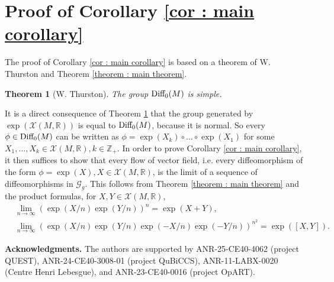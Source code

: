 \documentclass[10pt]{article}
\newcommand{\R}{{\mathbb R}}
\newcommand{\Z}{{\mathbb Z}}
\newcommand{\Chi}{{\mathcal X}}
\newtheorem{theorem}{Theorem}
\begin{document}
\section{Proof of Corollary \ref{cor : main corollary}}\label{sec:corollary}
The proof of Corollary \ref{cor : main corollary} is based on a theorem of W. Thurston \cite{thurston} and Theorem \ref{theorem : main theorem}.
\begin{theorem}[W. Thurston]\label{thurston theorem}
The group ${\rm Diff_0}(M)$ is simple. 
\end{theorem}
It is a direct consequence of Theorem \ref{thurston theorem} that the group generated by $\exp(\Chi(M,\R))$ is equal to ${\rm Diff_0}(M)$, because it is normal. So every $\phi\in {\rm Diff_0}(M)$ can be written as $\phi=\exp(X_k)\circ\dots\circ\exp(X_1)$ for some $X_1,\dots,X_k\in \Chi(M,\R), k\in \Z_+$. In order to prove Corollary \ref{cor : main corollary}, it then suffices to show that every flow of vector field, i.e. every diffeomorphism of the form $\phi=\exp(X), X\in\Chi(M,\R)$, is the limit of a sequence of diffeomorphisms in $\mathcal{G}_g$. This follows from Theorem \ref{theorem : main theorem} and the product formulas, for $X,Y\in \Chi(M,\R)$,
\begin{align*}
&\lim_{n\to \infty} \left(\exp(X/n)\exp(Y/n)\right)^n=\exp(X+Y),\\
&\lim_{n\to \infty} \left(\exp(X/n)\exp(Y/n)\exp(-X/n)\exp(-Y/n)\right)^{n^2}=\exp([X,Y]).
\end{align*}


\textbf{Acknowledgments.} The authors are supported by ANR-25-CE40-4062 (project QUEST), ANR-24-CE40-3008-01 (project QuBiCCS), ANR-11-LABX-0020 (Centre Henri Lebesgue), and \newline ANR-23-CE40-0016 (project OpART).


%

\end{document}
